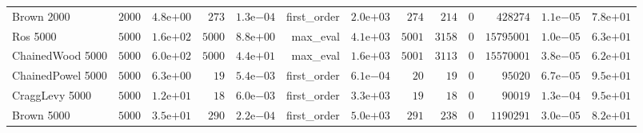 \begin{longtable}[c]{lrrrrrrrrrrrr}
Brown 2000 & \( 2000\) & \( 4.8\)e\(+00\) & \(  273\) & \( 1.3\)e\(-04\) & first\_order & \( 2.0\)e\(+03\) & \(  274\) & \(  214\) & \(    0\) & \(428274\) & \( 1.1\)e\(-05\) & \( 7.8\)e\(+01\) \\
Ros 5000 & \( 5000\) & \( 1.6\)e\(+02\) & \( 5000\) & \( 8.8\)e\(+00\) & max\_eval & \( 4.1\)e\(+03\) & \( 5001\) & \( 3158\) & \(    0\) & \(15795001\) & \( 1.0\)e\(-05\) & \( 6.3\)e\(+01\) \\
ChainedWood 5000 & \( 5000\) & \( 6.0\)e\(+02\) & \( 5000\) & \( 4.4\)e\(+01\) & max\_eval & \( 1.6\)e\(+03\) & \( 5001\) & \( 3113\) & \(    0\) & \(15570001\) & \( 3.8\)e\(-05\) & \( 6.2\)e\(+01\) \\
ChainedPowel 5000 & \( 5000\) & \( 6.3\)e\(+00\) & \(   19\) & \( 5.4\)e\(-03\) & first\_order & \( 6.1\)e\(-04\) & \(   20\) & \(   19\) & \(    0\) & \(95020\) & \( 6.7\)e\(-05\) & \( 9.5\)e\(+01\) \\
CraggLevy 5000 & \( 5000\) & \( 1.2\)e\(+01\) & \(   18\) & \( 6.0\)e\(-03\) & first\_order & \( 3.3\)e\(+03\) & \(   19\) & \(   18\) & \(    0\) & \(90019\) & \( 1.3\)e\(-04\) & \( 9.5\)e\(+01\) \\
Brown 5000 & \( 5000\) & \( 3.5\)e\(+01\) & \(  290\) & \( 2.2\)e\(-04\) & first\_order & \( 5.0\)e\(+03\) & \(  291\) & \(  238\) & \(    0\) & \(1190291\) & \( 3.0\)e\(-05\) & \( 8.2\)e\(+01\) \\
\hline 
\end{longtable}



